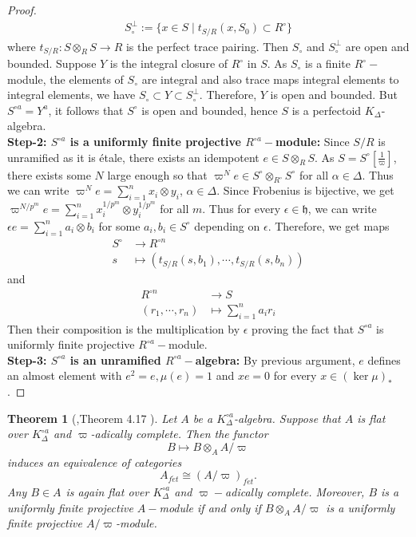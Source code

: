 \documentclass[12pts,a4paper]{amsart}
\newtheorem{theorem}[proposition]{Theorem}
\DeclareMathOperator{\fet}{f\acute{e}t}
\begin{document}
\begin{proof}
    \begin{align*}
        S^\perp_\circ:=\{x\in S\mid t_{S/R}(x,S_0)\subset R^\circ\}
    \end{align*}
    where $t_{S/R}:S\otimes_R S\to R$ is the perfect trace pairing. Then $S_\circ$ and $S^\perp_\circ$ are open and bounded. Suppose $Y$ is the integral closure of $R^\circ$ in $S$. As $S_\circ$ is a finite $R^\circ-$module, the elements of $S_\circ$ are integral and also trace maps integral elements to integral elements, we have $S_\circ\subset Y\subset S^\perp_\circ$. Therefore, $Y$ is open and bounded. But $S^{\circ a}=Y^a$, it follows that $S^\circ$ is open and bounded, hence $S$ is a perfectoid $K_\Delta$-algebra.\\
    \textbf{Step-2: $S^{\circ a}$ is a uniformly finite projective $R^{\circ a}-$module:} Since $S/R$ is unramified as it is \'etale, there exists an idempotent $e\in S\otimes_R S$. As $S=S^\circ\left[\frac{1}{\varpi}\right]$, there exists some $N$ large enough so that $\varpi^N e\in S^\circ\otimes_{R^\circ}S^\circ$ for all $\alpha\in\Delta$. Thus we can write $\varpi^N e=\sum\limits_{i=1}^n x_i\otimes y_i$, $\alpha\in\Delta$. Since Frobenius is bijective, we get $\varpi^{N/p^m} e=\sum\limits_{i=1}^n x^{1/p^m}_i\otimes y^{1/p^m}_i$ for all $m$. Thus for every $\epsilon\in\mathfrak{h}$, we can write $\epsilon e=\sum\limits_{i=1}^n a_i\otimes b_i$ for some $a_i,b_i\in S^\circ$ depending on $\epsilon$. Therefore, we get maps
    \begin{align*}
        S^\circ&\to R^{\circ n}\\
        s&\mapsto (t_{S/R}(s,b_1),\cdots,t_{S/R}(s,b_n))
    \end{align*}
    and
    \begin{align*}
        R^{\circ n}&\to S\\
        (r_1,\cdots,r_n)&\mapsto \sum\limits_{i=1}^n a_ir_i
    \end{align*}
    Then their composition is the multiplication by $\epsilon$ proving the fact that $S^{\circ a}$ is uniformly finite projective $R^{\circ a}-$module.\\
    \textbf{Step-3: $S^{\circ a}$ is an unramified $R^{\circ a}-$algebra:} By previous argument, $e$ defines an almost element with $e^2=e, \mu(e)=1$ and $xe=0$ for every $x\in(\ker\mu)_*$.
\end{proof}

\begin{theorem}[\cite{Sch},Theorem 4.17 ]
	Let $A$ be a $K^{\circ a}_\Delta$-algebra. Suppose that $A$ is flat over $K^{\circ a}_\Delta$ and $\varpi$-adically complete. Then the functor
	\[
	B \mapsto B \otimes_A A/\varpi
	\]
	induces an equivalence of categories
	\[
	A_{f\acute{e}t} \cong (A/\varpi)_{f\acute{e}t}.
	\]
	Any $B\in A_{\fet}$ is again flat over $K^{\circ a}_\Delta$ and $\varpi-$adically complete. Moreover, $B$ is a uniformly finite projective $A-$module if and only if $B \otimes_A A/\varpi$ is a uniformly finite projective $A/\varpi$-module.
\end{theorem}
\end{document}
